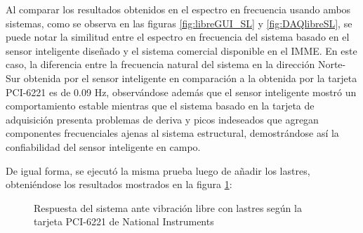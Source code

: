 Al comparar los resultados obtenidos en el espectro en frecuencia usando ambos sistemas, como se observa en las figuras \ref{fig:libreGUI_SL} y \ref{fig:DAQlibreSL}, se puede notar la similitud entre el espectro en frecuencia del sistema basado en el sensor inteligente diseñado y el sistema comercial disponible en el IMME. En este caso, la diferencia entre la frecuencia natural del sistema en la dirección Norte-Sur obtenida por el sensor inteligente en comparación a la obtenida por la tarjeta PCI-6221 es de 0.09 Hz, observándose además que el sensor inteligente mostró un comportamiento estable mientras que el sistema basado en la tarjeta de adquisición presenta problemas de deriva y picos indeseados que agregan componentes frecuenciales ajenas al sistema estructural, demostrándose así la confiabilidad del sensor inteligente en campo.


De igual forma, se ejecutó la misma prueba luego de añadir los lastres, obteniéndose los resultados mostrados en la figura \ref{fig:DAQlibreCL}:
\begin{figure}[H]
    \centering
    \hfill
    \caption{Respuesta del sistema ante vibración libre con lastres según la tarjeta PCI-6221 de National Instruments}
    \label{fig:DAQlibreCL}
\end{figure}


